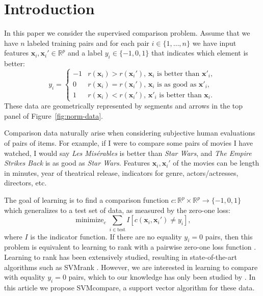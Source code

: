 \documentclass{article}
\newcommand{\RR}{\mathbb R}
\DeclareMathOperator*{\minimize}{minimize}
\begin{document}
\section{Introduction}

In this paper we consider the supervised comparison problem. Assume
that we have $n$ labeled training pairs and for each pair
$i\in\{1,\dots,n\}$ we have input features $\mathbf x_i,\mathbf
x_i'\in\RR^p$ and a label $y_i\in\{-1,0,1\}$ that indicates which
element is better:
\begin{equation}
  \label{eq:z}
  y_i =
  \begin{cases}
    -1 &  r(\mathbf x_i)>r(\mathbf x_i')
    \text{, $\mathbf x_i$ is better than $\mathbf x'_i$},\\
    0 & r(\mathbf x_i) = r(\mathbf x_i')
    \text{, $\mathbf x_i$ is as good as $\mathbf x'_i$},\\
    1 & r(\mathbf x_i)<r(\mathbf x_i')
    \text{, $\mathbf x'_i$ is better than $\mathbf x_i$}.
  \end{cases}
\end{equation}
These data are geometrically represented by segments and arrows in the
top panel of Figure~\ref{fig:norm-data}. 

Comparison data naturally arise when considering subjective human
evaluations of pairs of items. For example, if I were to compare some
pairs of movies I have watched, I would say \textit{Les Mis\'erables}
is better than \textit{Star Wars}, and \textit{The Empire Strikes
  Back} is as good as \textit{Star Wars}. Features $\mathbf
x_i,\mathbf x_i'$ of the movies can be length in minutes, year of
theatrical release, indicators for genre, actors/actresses, directors,
etc.

The goal of learning is to find a comparison function $c:\RR^p \times
\RR^p \rightarrow \{-1,0,1\}$ which generalizes to a test set of data,
as measured by the zero-one loss:
\begin{equation}
  \label{eq:min_c}
  \minimize_{c} 
  \sum_{i\in\text{test}}
  I\left[ c(\mathbf x_i, \mathbf x_i')\neq y_i \right],
\end{equation}
where $I$ is the indicator function. If there are no equality $y_i=0$
pairs, then this problem is equivalent to learning to rank with a
pairwise zero-one loss function \citep{learning-to-rank}. Learning to
rank has been extensively studied, resulting in state-of-the-art
algorithms such as SVMrank \citep{ranksvm}. However, we are interested
in learning to compare with equality $y_i=0$ pairs, which to our
knowledge has only been studied by \citet{rank-with-ties}. In this
article we propose SVMcompare, a support vector algorithm for these
data.
\end{document}
